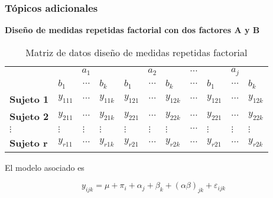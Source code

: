 \documentclass[12pt]{beamer}
\begin{document}
\begin{frame}
\frametitle{Tópicos adicionales}
\textbf{Diseño de medidas repetidas factorial con dos factores A y B}
\begin{table}[htbp]
  \centering
  \resizebox{12cm}{!} {
    \begin{tabular}{|l|l|l|l|l|l|l|l|l|l|l|}
\cline{2-11}    \multicolumn{1}{r|}{} & \multicolumn{3}{c|}{$a_1$} & \multicolumn{3}{c|}{$a_2$} & $\cdots$ & \multicolumn{3}{c|}{$a_j$} \\
\cline{2-11}    \multicolumn{1}{r|}{} & $b_1$    & $\cdots$ & $b_k$    & $b_1$    & $\cdots$ & $b_k$    & $\cdots$ & $b_1$    & $\cdots$ & $b_k$ \\
    \hline
    \textbf{Sujeto 1} & $y_{111}$  & $\cdots$ & $y_{11k}$  & $y_{121}$  & $\cdots$ & $y_{12k}$  & $\cdots$ & $y_{121}$  & $\cdots$ & $y_{12k}$ \\
    \hline
    \textbf{Sujeto 2} & $y_{211}$  & $\cdots$ & $y_{21k}$  & $y_{221}$  & $\cdots$ & $y_{22k}$  & $\cdots$ & $y_{221}$  & $\cdots$ & $y_{22k}$ \\
    \hline
    $\vdots$ & $\vdots$ & $\vdots$ & $\vdots$ & $\vdots$ & $\vdots$ & $\vdots$ & $\cdots$ & $\vdots$ & $\vdots$ & $\vdots$ \\
    \hline
    \textbf{Sujeto r} & $y_{r11}$  & $\cdots$ & $y_{r1k}$  & $y_{r21}$  & $\cdots$ & $y_{r2k}$  & $\cdots$ & $y_{r21}$  & $\cdots$ & $y_{r2k}$ \\
    \hline
    \end{tabular}%
    }
    \caption{Matriz de datos diseño de medidas repetidas factorial}
  \label{tab:addlabel}%
\end{table}%
El modelo asociado es

$$y_{ijk}=\mu+\pi_i+\alpha_j+\beta_k+(\alpha\beta)_{jk}+\varepsilon_{ijk}$$
\end{frame}
\end{document}

